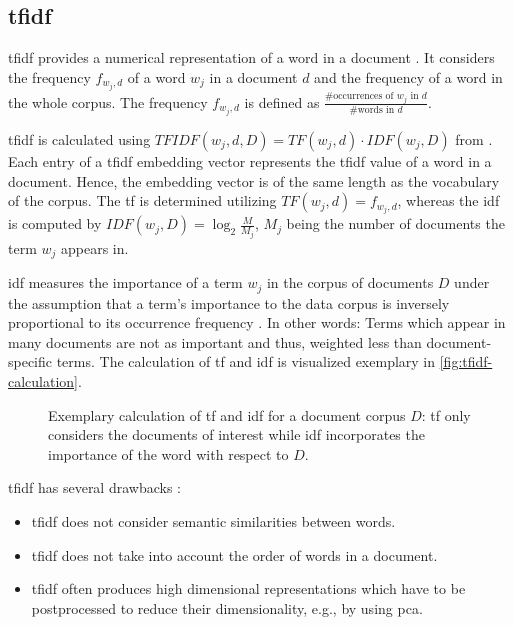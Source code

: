 \subsection{\acl*{tfidf}}\label{subsec:tfidf}

\ac{tfidf} provides a numerical representation of a word in a document \cite{clusteringDocs2020}.
It considers the frequency $f_{w_{j}, d}$  of a word $w_{j}$ in a document $d$ and the frequency of a word in the whole corpus. 
The frequency $f_{w_{j}, d}$ is defined as $\frac{\# \text{occurrences of } w_{j} \text{ in }d}{\# \text{words in }d}$.

\ac{tfidf} is calculated using $TFIDF(w_{j}, d, D) = TF(w_{j}, d) \cdot IDF(w_{j}, D)$ from \cite{clusteringDocs2020}.
Each entry of a \ac{tfidf} embedding vector represents the \ac{tfidf} value of a word in a document.
Hence, the embedding vector is of the same length as the vocabulary of the corpus.
The \ac{tf} is determined utilizing $TF(w_{j}, d) = f_{w_{j}, d}$, whereas the \ac{idf} is computed by $IDF(w_{j}, D) = \log_2\frac{M}{M_{j}}$, 
$M_{j}$ being the number of documents the term $w_{j}$ appears in.

\ac{idf} measures the importance of a term $w_{j}$ in the corpus of documents $D$
under the assumption that a term's importance to the data corpus is inversely proportional to its occurrence frequency \cite{tfidf2008}.
In other words: Terms which appear in many documents are not as important and thus, weighted less than document-specific terms. 
The calculation of \ac{tf} and \ac{idf} is visualized exemplary in \autoref{fig:tfidf-calculation}.


\begin{figure}[!htb] %
    \centering
    
    \caption[Exemplary calculation of \ac{tf} and \ac{idf} values]{
        Exemplary calculation of \ac{tf} and \ac{idf} for a document corpus $D$: 
        \ac{tf} only considers the documents of interest while 
        \ac{idf} incorporates the importance of the word with respect to $D$.
    }
    \label{fig:tfidf-calculation}
\end{figure}

\ac{tfidf} has several drawbacks \cite{clusteringDocs2020,tfidf2008}:
\begin{itemize}
    \item \ac{tfidf} does not consider semantic similarities between words.
    \item \ac{tfidf} does not take into account the order of words in a document.
    \item \ac{tfidf} often produces high dimensional representations which have to be postprocessed to reduce their dimensionality, e.g., by using \ac{pca}.
\end{itemize}

